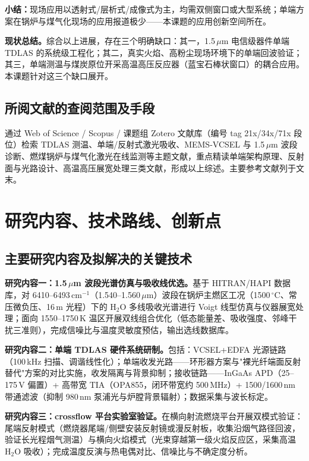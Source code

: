 \documentclass[12pt,a4paper]{article}
\begin{document}
\textbf{小结：}现场应用以透射式/层析式/成像式为主，均需双侧窗口或大型系统；单端方案在锅炉与煤气化现场的应用报道极少——本课题的应用创新空间所在。

\textbf{现状总结。}综合以上进展，存在三个明确缺口：其一，1.5\,$\mu$m 电信级器件单端 TDLAS 的系统级工程化；其二，真实火焰、高粉尘现场环境下的单端回波验证；其三，单端测温与煤炭原位开采高温高压反应器（蓝宝石棒状窗口）的耦合应用。本课题针对这三个缺口展开。

\subsection{所阅文献的查阅范围及手段}

通过 Web of Science / Scopus / 课题组 Zotero 文献库（编号 tag 21x/34x/71x 段位）检索 TDLAS 测温、单端/反射式激光吸收、MEMS-VCSEL 与 1.5\,$\mu$m 波段诊断、燃煤锅炉与煤气化激光在线监测等主题文献，重点精读单端架构原理、反射面与光路设计、高温高压展宽处理三类文献，形成以上综述。主要参考文献列于文末。

\section{研究内容、技术路线、创新点}

\subsection{主要研究内容及拟解决的关键技术}

\textbf{研究内容一：1.5\,$\mu$m 波段光谱仿真与吸收线优选。}基于 HITRAN/HAPI 数据库，对 6410--6493\,cm$^{-1}$（1.540--1.560\,$\mu$m）波段在锅炉主燃区工况（1500\,$^\circ$C、常压微负压、16\,m 光程）下的 H$_2$O 多线吸收光谱进行 Voigt 线型仿真与仪器展宽处理；面向 1550--1750\,K 温区开展双线组合优化（低态能量差、吸收强度、邻峰干扰三准则），完成信噪比与温度灵敏度预估，输出选线数据库。

\textbf{研究内容二：单端 TDLAS 硬件系统研制。}包括：VCSEL+EDFA 光源链路（100\,kHz 扫描、调谐线性化）；单端收发光路——环形器方案与"裸光纤端面反射替代"方案的对比实施，收发隔离与背景抑制；接收链路——InGaAs APD（25--175\,V 偏置）+ 高带宽 TIA（OPA855，闭环带宽约 500\,MHz）+ 1500/1600\,nm 带通滤波（抑制 980\,nm 泵浦光与炉膛背景辐射）；数据采集与波长标定。

\textbf{研究内容三：crossflow 平台实验室验证。}在横向射流燃烧平台开展双模式验证：尾端反射模式（燃烧器尾端/侧壁安装反射镜或漫反射板，收集沿烟气路径回波，验证长光程烟气测温）与横向火焰模式（光束穿越第一级火焰反应区，采集高温 H$_2$O 吸收）；完成温度反演与热电偶对比、信噪比与不确定度分析。
\end{document}
